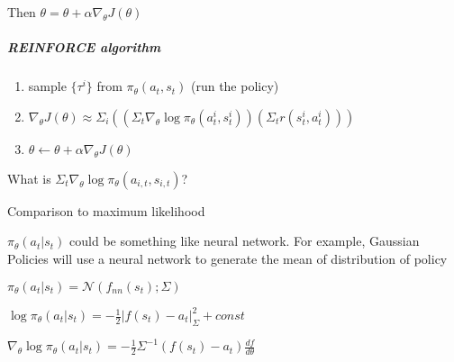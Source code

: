 Then $\theta = \theta + \alpha \nabla_{\theta}J(\theta)$

\subparagraph{REINFORCE algorithm}

\begin{enumerate}
\item sample $\{\tau^i\}$ from $\pi_{\theta}(a_t, s_t)$ (run the policy)
\item $\nabla_{\theta}J(\theta)\approx \Sigma_i((\Sigma_t \nabla_\theta \log{\pi_\theta(a_t^i,s_t^i)})(\Sigma_t r(s_t^i,a_t^i)))$
\item $\theta\leftarrow \theta + \alpha\nabla_\theta J(\theta)$
\end{enumerate}

What is $\Sigma_t \nabla_\theta \log{\pi_\theta(a_{i,t},s_{i,t})}$?

Comparison to maximum likelihood

$\pi_\theta(a_t|s_t)$ could be something like neural network. 
For example, Gaussian Policies will use a neural network 
to generate the mean of distribution of policy

$\pi_{\theta}(a_t|s_t)=\mathcal{N}(f_{nn}(s_t);\Sigma)$

$\log{\pi_\theta(a_t|s_t)}=-\frac{1}{2}|f(s_t)-a_t|_{\Sigma}^2+ const$

$\nabla_{\theta}\log{\pi_\theta(a_t|s_t)}=-\frac{1}{2}\Sigma^{-1}(f(s_t)-a_t)\frac{df}{d\theta}$